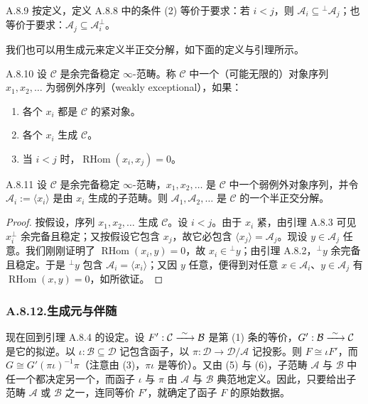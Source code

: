 \begin{rem}{A.8.9}\label{thm:a4-18-10}
按定义，定义 A.8.8 中的条件 (2) 等价于要求：若 $i<j$，则 $\mathcal A_i\subseteq{}^{\perp}\mathcal A_j$；也等价于要求：$\mathcal A_j\subseteq\mathcal A_i^{\perp}$。
\end{rem}

我们也可以用生成元来定义半正交分解，如下面的定义与引理所示。

\begin{defn}{A.8.10}\label{thm:a4-18-11}
设 $\mathcal C$ 是余完备稳定 $\infty$-范畴。称 $\mathcal C$ 中一个（可能无限的）对象序列 $x_1,x_2,\dots$ 为弱例外序列（weakly exceptional），如果：
\begin{enumerate}[label=(\arabic*),leftmargin=2.4em,itemsep=0.15em]
\item 各个 $x_i$ 都是 $\mathcal C$ 的紧对象。
\item 各个 $x_i$ 生成 $\mathcal C$。
\item 当 $i<j$ 时，$\operatorname{RHom}(x_i,x_j)=0$。
\end{enumerate}
\end{defn}

\begin{lem}{A.8.11}\label{thm:a4-18-12}
设 $\mathcal C$ 是余完备稳定 $\infty$-范畴，$x_1,x_2,\dots$ 是 $\mathcal C$ 中一个弱例外对象序列，并令 $\mathcal A_i:=\langle x_i\rangle$ 是由 $x_i$ 生成的子范畴。则 $\mathcal A_1,\mathcal A_2,\dots$ 是 $\mathcal C$ 的一个半正交分解。
\end{lem}
\begin{proof}
按假设，序列 $x_1,x_2,\dots$ 生成 $\mathcal C$。设 $i<j$。由于 $x_i$ 紧，由引理 A.8.3 可见 $x_i^{\perp}$ 余完备且稳定；又按假设它包含 $x_j$，故它必包含 $\langle x_j\rangle=\mathcal A_j$。现设 $y\in\mathcal A_j$ 任意。我们刚刚证明了 $\operatorname{RHom}(x_i,y)=0$，故 $x_i\in{}^{\perp}y$；由引理 A.8.2，${}^{\perp}y$ 余完备且稳定。于是 ${}^{\perp}y$ 包含 $\mathcal A_i=\langle x_i\rangle$；又因 $y$ 任意，便得到对任意 $x\in\mathcal A_i$、$y\in\mathcal A_j$ 有 $\operatorname{RHom}(x,y)=0$，如所欲证。
\end{proof}

\subsubsection*{A.8.12.\quad 生成元与伴随}
现在回到引理 A.8.4 的设定。设 $F':\mathcal C\xrightarrow{\ \sim\ }\mathcal B$ 是第 (1) 条的等价，$G':\mathcal B\xrightarrow{\ \sim\ }\mathcal C$ 是它的拟逆。以 $\iota:\mathcal B\subseteq\mathcal D$ 记包含函子，以 $\pi:\mathcal D\to\mathcal D/\mathcal A$ 记投影。则 $F\cong\iota F'$，而 $G\cong G'(\pi\iota)^{-1}\pi$（注意由 (3)，$\pi\iota$ 是等价）。又由 (5) 与 (6)，子范畴 $\mathcal A$ 与 $\mathcal B$ 中任一个都决定另一个，而函子 $\iota$ 与 $\pi$ 由 $\mathcal A$ 与 $\mathcal B$ 典范地定义。因此，只要给出子范畴 $\mathcal A$ 或 $\mathcal B$ 之一，连同等价 $F'$，就确定了函子 $F$ 的原始数据。

